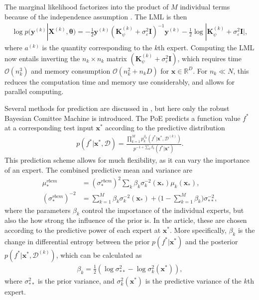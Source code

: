 \documentclass[twoside,english]{uiofysmaster}
\begin{document}
The marginal likelihood factorizes into the product of $M$ individual terms because of the independence assumption \cite{deisenroth2015distributed}. The LML is then
\begin{align}
\log p(\textbf{y}^{(k)}|\textbf{X}^{(k)}, \boldsymbol{\theta}) = - \frac{1}{2} \textbf{y}^{(k)} (\textbf{K}_{\psi}^{(k)} + \sigma_{\varepsilon}^2 \textbf{I})^{-1}\textbf{y}^{(k)} - \frac{1}{2} \log
 |\textbf{K}_{\psi}^{(k)} + \sigma_{\varepsilon}^2 \textbf{I} |,
\end{align}
where $a^{(k)}$ is the quantity corresponding to the $k$th expert. Computing the LML now entails inverting the $n_k \times n_k$ matrix $(\textbf{K}_{\psi}^{(k)} + \sigma_{\varepsilon}^2 \textbf{I})$, which requires time $\mathcal{O}(n_k^3)$ and memory consumption $\mathcal{O}(n_k^2 + n_kD)$ for $\textbf{x} \in \mathbb{R}^D$. For $n_k \ll N$, this reduces the computation time and memory use considerably, and allows for parallel computing. 

Several methods for prediction are discussed in \cite{deisenroth2015distributed}, but here only the robust Bayesian Comittee Machine is introduced. The PoE predicts a function value $f^*$ at a corresponding test input $\textbf{x}^*$ according to the predictive distribution
\begin{align}
p(f^* | \textbf{x}^*, \mathcal{D}) = \frac{\prod_{k=1}^M p_k^{\beta_k} (f^*| \textbf{x}^*, \mathcal{D}^{(k)})}{p^{-1 + \sum_k \beta_k} (f^* | \textbf{x}^*)}.
\end{align}
This prediction scheme allows for much flexibility, as it can vary the importance of an expert. The combined predictive mean and variance are 
\begin{align}
\mu_*^{rbcm} &= (\sigma_*^{rbcm})^2 \sum_k \beta_k \sigma_k^{-2} (\textbf{x}_*) \mu_k (\textbf{x}_*),\label{Eq:: gaussian process : DGP mu} \\
(\sigma_*^{rbcm})^{-2} &= \sum_{k=1}^M \beta_k \sigma_k^{-2} (\textbf{x}_*) + \big(1 - \sum_{k=1}^M \beta_k \big) \sigma_{**}^{-2},\label{Eq:: gaussian process : DGP sigma}
\end{align}
where the parameters $\beta_k$ control the importance of the individual experts, but also the how strong the influence of the prior is. In the article, these are chosen according to the predictive power of each expert at $\textbf{x}^*$. More specifically, $\beta_k$ is the change in differential entropy between the prior $p(f^* | \textbf{x}^*)$ and the posterior $p(f^* | \textbf{x}^*, \mathcal{D}^{(k)})$, which can be calculated as 
\begin{align}
\beta_k = \frac{1}{2} (\log \sigma_{**}^2 - \log \sigma^2_k(\textbf{x}^*) ),
\end{align}
where $\sigma_{**}^2$ is the prior variance, and $\sigma_k^2 (\textbf{x}^*)$ is the predictive variance of the $k$th expert.
\end{document}
